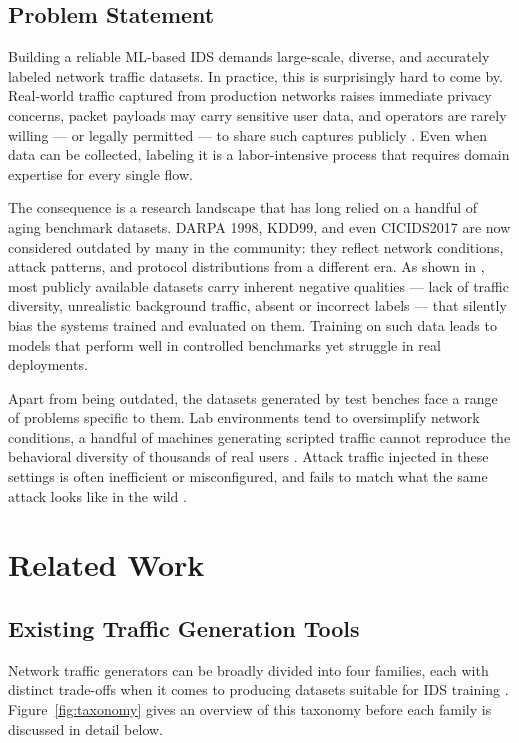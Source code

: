 \documentclass[conference]{IEEEtran}
\begin{document}
\subsection{Problem Statement}

Building a reliable ML-based IDS demands large-scale, diverse, and
accurately labeled network traffic datasets. In practice, this is
surprisingly hard to come by. Real-world traffic captured from production
networks raises immediate privacy concerns, packet payloads may carry
sensitive user data, and operators are rarely willing --- or legally
permitted --- to share such captures publicly \cite{ring2019}. Even when
data can be collected, labeling it is a labor-intensive process that
requires domain expertise for every single flow.

The consequence is a research landscape that has long relied on a
handful of aging benchmark datasets. DARPA 1998, KDD99, and even
CICIDS2017 \cite{sharafaldin2018} are now considered outdated by many
in the community: they reflect network conditions, attack patterns, and
protocol distributions from a different era. As shown in \cite{id2t2021},
most publicly available datasets carry inherent negative qualities ---
lack of traffic diversity, unrealistic background traffic, absent or
incorrect labels --- that silently bias the systems trained and evaluated
on them. Training on such data leads to models that perform well in
controlled benchmarks yet struggle in real deployments.

Apart from being outdated, the datasets generated by test benches face a range 
of problems specific to them. Lab environments tend to oversimplify network conditions,
a handful of machines generating scripted traffic cannot reproduce
the behavioral diversity of thousands of real users \cite{ring2019}.
Attack traffic injected in these settings is often inefficient or
misconfigured, and fails to match what the same attack looks like
in the wild \cite{survey2025}.


\section{Related Work}
\subsection{Existing Traffic Generation Tools}

Network traffic generators can be broadly divided into four families,
each with distinct trade-offs when it comes to producing datasets
suitable for IDS training \cite{adeleke2022}. Figure~\ref{fig:taxonomy}
gives an overview of this taxonomy before each family is discussed
in detail below.
\end{document}
